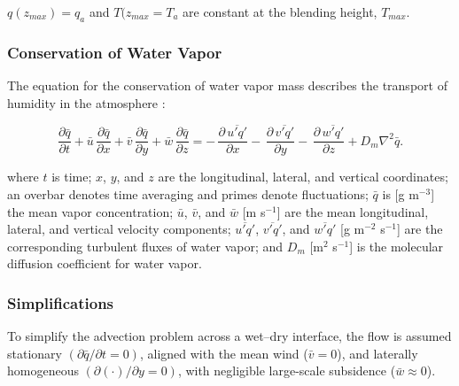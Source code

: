 \documentclass{article}
\begin{document}
    
    $q(z_{max}) = q_a$ and $T(z_{max} = T_a$ are constant at the blending height, $T_{max}$. 

    \subsubsection*{Conservation of Water Vapor}

    The equation for the conservation of water vapor mass describes the transport of humidity in the atmosphere \cite{brutsaert2013evaporation}: 


    \begin{equation}
    \frac{\partial \bar{q}}{\partial t}
    + \bar{u}\,\frac{\partial \bar{q}}{\partial x}
    + \bar{v}\,\frac{\partial \bar{q}}{\partial y}
    + \bar{w}\,\frac{\partial \bar{q}}{\partial z}
    =
    -\,\frac{\partial\,\overline{u' q'}}{\partial x}
    -\,\frac{\partial\,\overline{v' q'}}{\partial y}
    -\,\frac{\partial\,\overline{w' q'}}{\partial z}
    + D_m \nabla^2 \bar{q} .
    \label{eq:3.44}
    \end{equation}

    \noindent where $t$ is time; $x$, $y$, and $z$ are the longitudinal, lateral, and vertical coordinates; an overbar denotes time averaging and primes denote fluctuations; 
    $\bar{q}$ is [g m$^{-3}$] the mean vapor concentration; 
    $\bar{u}$, $\bar{v}$, and $\bar{w}$ [m s$^{-1}$] are the mean longitudinal, lateral, and vertical velocity components; $\overline{u' q'}$, $\overline{v' q'}$, and $\overline{w' q'}$ [g m$^{-2}$ s$^{-1}$]  are the corresponding turbulent fluxes of water vapor; 
    and $D_m$ [m$^{2}$ s$^{-1}$] is the molecular diffusion coefficient for water vapor.

    \subsubsection*{Simplifications}


    To simplify the advection problem across a wet--dry interface, the flow is assumed stationary
    $\left(\partial \bar q/\partial t = 0\right)$, aligned with the mean wind ($\bar v=0$), and laterally homogeneous
    $\left(\partial(\cdot)/\partial y=0\right)$, with negligible large-scale subsidence ($\bar w \approx 0$).
\end{document}
